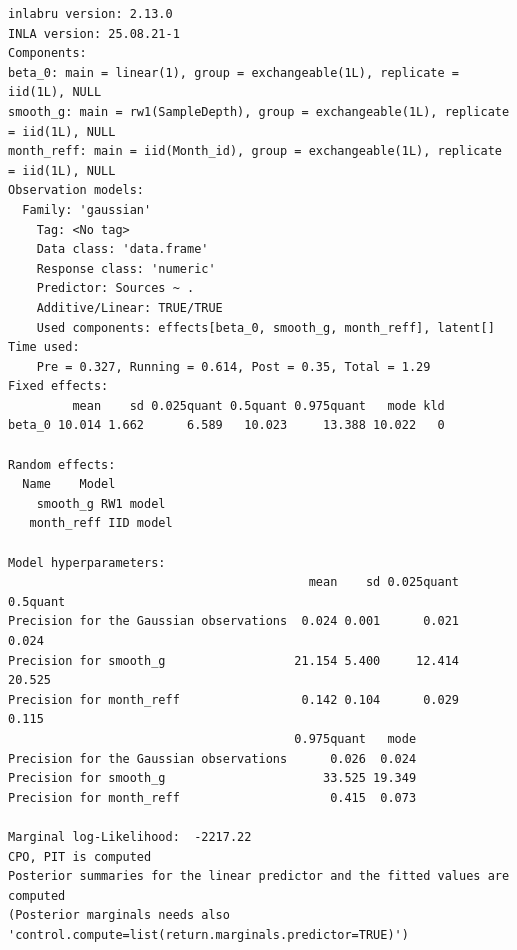 \documentclass[
  letterpaper,
  DIV=11,
  numbers=noendperiod]{scrartcl}
\newenvironment{Shaded}{\begin{snugshade}}{\end{snugshade}}
\newcommand{\AttributeTok}[1]{\textcolor[rgb]{0.40,0.45,0.13}{#1}}
\newcommand{\CommentTok}[1]{\textcolor[rgb]{0.37,0.37,0.37}{#1}}
\newcommand{\DecValTok}[1]{\textcolor[rgb]{0.68,0.00,0.00}{#1}}
\newcommand{\ErrorTok}[1]{\textcolor[rgb]{0.68,0.00,0.00}{#1}}
\newcommand{\FunctionTok}[1]{\textcolor[rgb]{0.28,0.35,0.67}{#1}}
\newcommand{\NormalTok}[1]{\textcolor[rgb]{0.00,0.23,0.31}{#1}}
\newcommand{\OtherTok}[1]{\textcolor[rgb]{0.00,0.23,0.31}{#1}}
\newcommand{\SpecialCharTok}[1]{\textcolor[rgb]{0.37,0.37,0.37}{#1}}
\newcommand{\StringTok}[1]{\textcolor[rgb]{0.13,0.47,0.30}{#1}}
\begin{document}
\begin{Shaded}
\end{Shaded}

\begin{verbatim}
inlabru version: 2.13.0
INLA version: 25.08.21-1
Components:
beta_0: main = linear(1), group = exchangeable(1L), replicate = iid(1L), NULL
smooth_g: main = rw1(SampleDepth), group = exchangeable(1L), replicate = iid(1L), NULL
month_reff: main = iid(Month_id), group = exchangeable(1L), replicate = iid(1L), NULL
Observation models:
  Family: 'gaussian'
    Tag: <No tag>
    Data class: 'data.frame'
    Response class: 'numeric'
    Predictor: Sources ~ .
    Additive/Linear: TRUE/TRUE
    Used components: effects[beta_0, smooth_g, month_reff], latent[]
Time used:
    Pre = 0.327, Running = 0.614, Post = 0.35, Total = 1.29 
Fixed effects:
         mean    sd 0.025quant 0.5quant 0.975quant   mode kld
beta_0 10.014 1.662      6.589   10.023     13.388 10.022   0

Random effects:
  Name    Model
    smooth_g RW1 model
   month_reff IID model

Model hyperparameters:
                                          mean    sd 0.025quant 0.5quant
Precision for the Gaussian observations  0.024 0.001      0.021    0.024
Precision for smooth_g                  21.154 5.400     12.414   20.525
Precision for month_reff                 0.142 0.104      0.029    0.115
                                        0.975quant   mode
Precision for the Gaussian observations      0.026  0.024
Precision for smooth_g                      33.525 19.349
Precision for month_reff                     0.415  0.073

Marginal log-Likelihood:  -2217.22 
CPO, PIT is computed 
Posterior summaries for the linear predictor and the fitted values are computed
(Posterior marginals needs also 'control.compute=list(return.marginals.predictor=TRUE)')
\end{verbatim}
\end{document}
